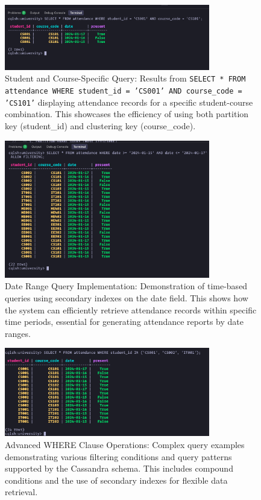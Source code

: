 \begin{figure}[H]
  \centering
  \includegraphics[width=0.8\textwidth]{task-2/screenshots/select-where_student_id_and_course_code.png}
  \caption{Student and Course-Specific Query: Results from \texttt{SELECT * FROM attendance WHERE student\_id = 'CS001' AND course\_code = 'CS101'} displaying attendance records for a specific student-course combination. This showcases the efficiency of using both partition key (student\_id) and clustering key (course\_code).}
  \label{fig:task2-select-student-course}
\end{figure}

\begin{figure}[H]
  \centering
  \includegraphics[width=0.8\textwidth]{task-2/screenshots/date_range_query.png}
  \caption{Date Range Query Implementation: Demonstration of time-based queries using secondary indexes on the date field. This shows how the system can efficiently retrieve attendance records within specific time periods, essential for generating attendance reports by date ranges.}
  \label{fig:task2-date-range}
\end{figure}

\begin{figure}[H]
  \centering
  \includegraphics[width=0.8\textwidth]{task-2/screenshots/where_query.png}
  \caption{Advanced WHERE Clause Operations: Complex query examples demonstrating various filtering conditions and query patterns supported by the Cassandra schema. This includes compound conditions and the use of secondary indexes for flexible data retrieval.}
  \label{fig:task2-where-query}
\end{figure}

